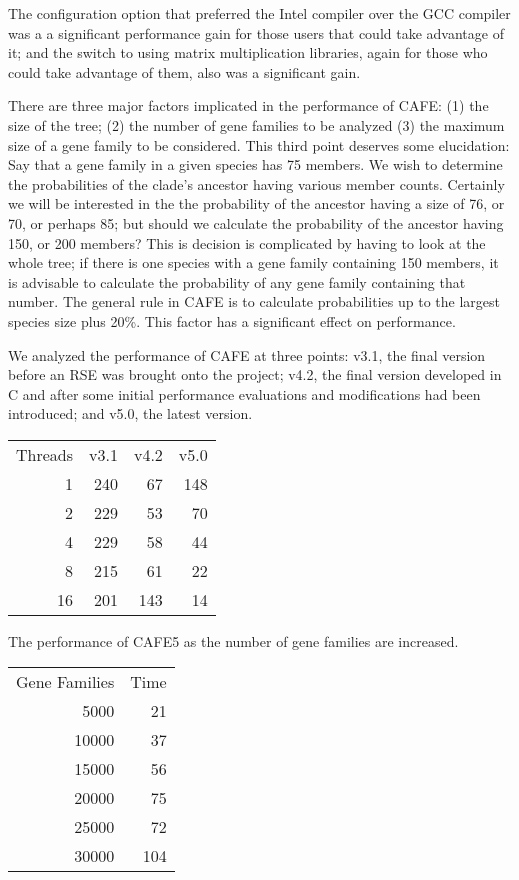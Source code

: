 \documentclass[acmtog, authorversion]{acmart}
\begin{document}
The configuration option that preferred the Intel compiler over the GCC compiler was a a significant performance gain for those users that could take advantage of it; and the switch to using matrix multiplication libraries, again for those who could take advantage of them, also was a significant gain.

There are three major factors implicated in the performance of CAFE: (1) the size of the tree; (2) the number of gene families to be analyzed (3) the maximum size of a gene family to be considered. This third point deserves some elucidation: Say that a gene family in a given species has 75 members. We wish to determine the probabilities of the clade's ancestor having various member counts. Certainly we will be interested in the the probability of the ancestor having a size of 76, or 70, or perhaps 85; but should we calculate the probability of the ancestor having 150, or 200 members? This is decision is complicated by having to look at the whole tree; if there is one species with a gene family containing 150 members, it is advisable to calculate the probability of any gene family containing that number. The general rule in CAFE is to calculate probabilities up to the largest species size plus 20\%. This factor has a significant effect on performance.

We analyzed the performance of CAFE at three points: v3.1, the final version before an RSE was brought onto the project; v4.2, the final version developed in C and after some initial performance evaluations and modifications had been introduced; and v5.0, the latest version. 

\begin{tabular}{ r r r r }
  Threads & v3.1 & v4.2 & v5.0 \\
  1 & 240 & 67    & 148 \\
  2 & 229 & 53    &  70 \\
  4 & 229 & 58    &  44 \\
  8 & 215 & 61    &  22    \\
  16 & 201 & 143  &  14 
\end{tabular}

The performance of CAFE5 as the number of gene families are increased.

\begin{tabular}{ r r }
  Gene Families & Time \\
  5000 & 21  \\
  10000 & 37  \\
  15000 & 56  \\
  20000 & 75   \\
  25000 & 72 \\
  30000 & 104
\end{tabular}
\end{document}
